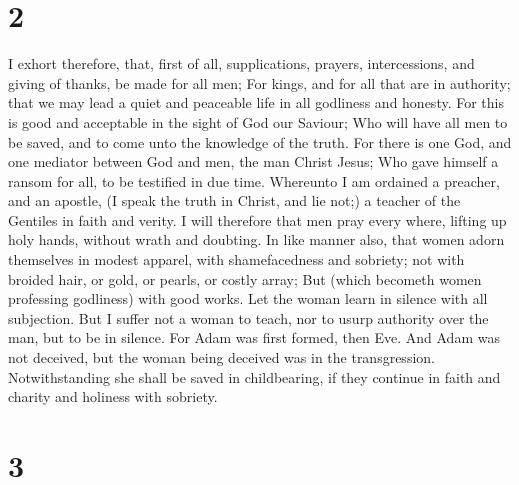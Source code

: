 \hypertarget{section-1}{%
\section{2}\label{section-1}}

 I exhort therefore, that, first of all, supplications,
prayers, intercessions, and giving of thanks, be made for all men;
 For kings, and for all that are in authority; that we may
lead a quiet and peaceable life in all godliness and honesty.
 For this is good and acceptable in the sight of God our
Saviour;  Who will have all men to be saved, and to come
unto the knowledge of the truth.  For there is one God, and
one mediator between God and men, the man Christ Jesus;  Who
gave himself a ransom for all, to be testified in due time. 
Whereunto I am ordained a preacher, and an apostle, (I speak the truth
in Christ, and lie not;) a teacher of the Gentiles in faith and verity.
 I will therefore that men pray every where, lifting up holy
hands, without wrath and doubting.  In like manner also,
that women adorn themselves in modest apparel, with shamefacedness and
sobriety; not with broided hair, or gold, or pearls, or costly array;
 But (which becometh women professing godliness) with good
works.  Let the woman learn in silence with all subjection.
 But I suffer not a woman to teach, nor to usurp authority
over the man, but to be in silence.  For Adam was first
formed, then Eve.  And Adam was not deceived, but the woman
being deceived was in the transgression.  Notwithstanding
she shall be saved in childbearing, if they continue in faith and
charity and holiness with sobriety.

\hypertarget{section-2}{%
\section{3}\label{section-2}}

